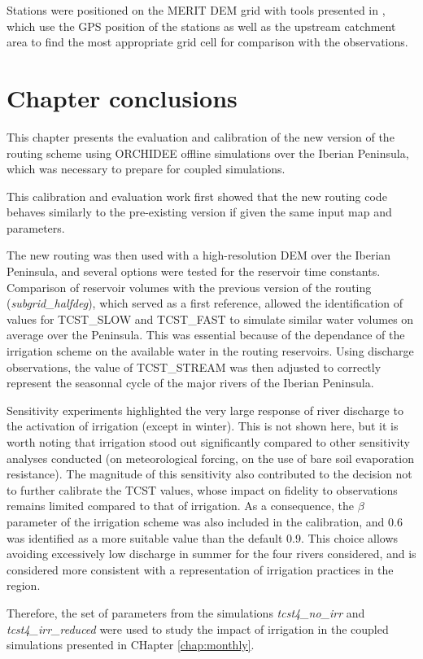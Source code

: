 Stations were positioned on the MERIT DEM grid with tools presented in \cite{polcher_hydrological_2023}, which use the GPS position of the stations as well as the upstream catchment area to find the most appropriate grid cell for comparison with the observations. 

\section{Chapter conclusions}

This chapter presents the evaluation and calibration of the new version of the routing scheme using ORCHIDEE offline simulations  over the Iberian Peninsula, which was necessary to prepare for coupled simulations.

This calibration and evaluation work first showed that the new routing code behaves similarly to the pre-existing version if given the same input map and parameters.%

The new routing was then used with a high-resolution DEM over the Iberian Peninsula, and several options were tested for the reservoir time constants. 
Comparison of reservoir volumes with the previous version of the routing (\textit{subgrid\_halfdeg}), which served as a first reference, allowed the identification of values for TCST\_SLOW and TCST\_FAST to simulate similar water volumes on average over the Peninsula. This was essential because of the dependance of the irrigation scheme on the available water in the routing reservoirs.
Using discharge observations, the value of TCST\_STREAM was then adjusted to correctly represent the seasonnal cycle of the major rivers of the Iberian Peninsula.

Sensitivity experiments highlighted the very large response of river discharge to the activation of irrigation (except in winter). 
This is not shown here, %
but it is worth noting that irrigation stood out significantly compared to other sensitivity analyses conducted (on meteorological forcing, on the use of bare soil evaporation resistance). 
The magnitude of this sensitivity also contributed to the decision not to further calibrate the TCST values, whose impact on fidelity to observations remains limited compared to that of irrigation.
As a consequence, the $\beta$ parameter of the irrigation scheme was also included in the calibration, and 0.6 was identified as a more suitable value than the default 0.9. This choice allows avoiding excessively low discharge in summer for the four rivers considered, and is considered more consistent with a representation of irrigation practices in the region.

Therefore, the set of parameters from the simulations \textit{tcst4\_no\_irr} and \textit{tcst4\_irr\_reduced} were used to study the impact of irrigation in the coupled simulations presented in CHapter \ref{chap:monthly}.
